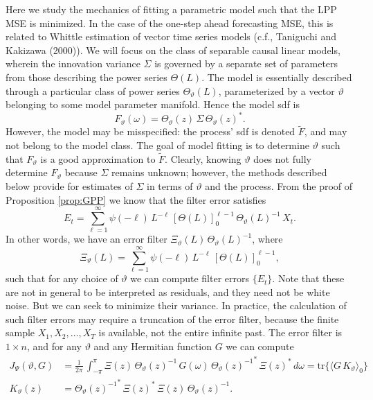 \documentclass[a4paper]{book}
\begin{document}
 Here we study the mechanics of fitting a parametric model such that the LPP MSE
 is minimized.  In the case of the one-step ahead forecasting MSE, this is related
 to Whittle estimation of vector time series models (c.f.,  Taniguchi and Kakizawa (2000)).
  We will focus on the class of separable causal linear models, wherein the innovation variance
 $\Sigma$ is governed by a separate set of parameters from those describing the power
 series $\Theta (L)$.  The model is essentially described through a particular class of
 power series   $\Theta_{\vartheta} (L)$, parameterized by a vector $\vartheta $
  belonging to some model  parameter manifold.    Hence the model sdf is
\[
  F_{\vartheta} (\omega) = \Theta_{\vartheta} (z) \, \Sigma \,  { \Theta_{\vartheta} (z) }^*.
\]
 However, the model may be misspecified: the process' sdf is denoted $\widetilde{F}$, 
  and may not
 belong to the model class.  The goal of model fitting is to determine $\vartheta$ 
  such that
 $F_{\vartheta}$ is a good approximation to $\widetilde{F}$.  
 Clearly, knowing $\vartheta$ does not
 fully determine $F_{\vartheta}$ because $\Sigma$ remains unknown; however, the methods
 described below provide for estimates of $\Sigma$ in terms of $\vartheta$ and the process.
 From the proof of Proposition \ref{prop:GPP} we know that the filter error satisfies
\[
  E_t = \sum_{\ell =1 }^{\infty} \psi (-\ell) \, L^{-\ell} \,  {[ \Theta (L) ]}_0^{\ell - 1} \, 
   { \Theta_{\vartheta} (L) }^{-1} \, X_t.
\] 
 In other words, we have an error filter $ \Xi_{\vartheta} (L) \,  
  { \Theta_{\vartheta} (L) }^{-1}  $,
 where
\[
  \Xi_{\vartheta} (L)  = \sum_{\ell =1 }^{\infty} \psi (-\ell) \,  L^{-\ell} \,
   {[ \Theta (L) ]}_0^{\ell - 1},
\]
  such that for any choice of $\vartheta $ we can compute filter errors $\{ E_t \}$.
 Note that these are not in general to be interpreted as residuals, and they need not be white noise.
  But we can seek to minimize their variance.  In practice,
 the calculation of such filter errors  may require a truncation of the error filter, because the finite
 sample $X_1, X_2, \ldots, X_T$ is available, not the entire infinite past.  The error filter is
 $1 \times n$, and for any $\vartheta $ and any Hermitian function $G$ we can compute
\begin{align*}
  J_{\Psi} (\vartheta, G) & 	= \frac{1}{2 \pi} \, \int_{-\pi}^{\pi} \Xi (z) \,
  { \Theta_{\vartheta} (z) }^{-1} \, G(\omega)
  \,  {{ \Theta_{\vartheta} (z) }^{-1} }^* \, { \Xi (z) }^* \, d\omega  = \mbox{tr} \{ 
 { \langle G \, K_{\vartheta} \rangle }_0 \} \\
   K_{\vartheta} (z) & =  {{ \Theta_{\vartheta} (z) }^{-1} }^* \, { \Xi (z) }^* \,  \Xi (z) \, 
 { \Theta_{\vartheta} (z) }^{-1}.
\end{align*}
\end{document}
